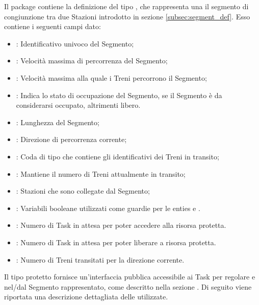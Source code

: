 	Il package  contiene la definizione del tipo ,  che rappresenta una il segmento di congiunzione tra due Stazioni introdotto in sezione \ref{subsec:segment_def}. Esso contiene i seguenti campi dato:
	\begin{itemize}
		
		\item {}: Identificativo univoco del Segmento;
		\item {}: Velocità massima di percorrenza del Segmento;
		\item {}: Velocità massima alla quale i Treni percorrono il Segmento;
		\item {}: Indica lo stato di occupazione del Segmento, se  il Segmento è da considerarsi occupato, altrimenti libero.
		\item {}: Lunghezza del Segmento;
		
		\item {}: Direzione di percorrenza corrente;
		
		\item {}: Coda di tipo  che contiene gli identificativi dei Treni in transito;
		\item {}: Mantiene il numero di Treni attualmente in transito;
		
		
		\item {}: Stazioni che sono collegate dal Segmento; 
		
		\item {}: Variabili booleane utilizzati come guardie per le enties  e .
		
		\item {}: Numero di Task in attesa per poter accedere alla risorsa protetta.
		
		\item {}:  Numero di Task in attesa per poter liberare a risorsa protetta. 
		
		\item {}: Numero di Treni transitati per la direzione corrente.
		
	\end{itemize}
	
	Il tipo protetto  fornisce un'interfaccia pubblica accessibile ai Task  per regolare  e  nel/dal Segmento rappresentato, come descritto nella sezione \label{subsubsec:segment_access}. Di seguito viene riportata una descrizione dettagliata delle  utilizzate.
	
